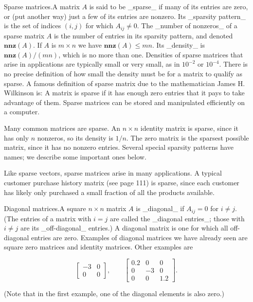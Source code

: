 
Sparse matrices.A matrix \(A\) is said to be _sparse_ if many of its entries are zero, or (put another way) just a few of its entries are nonzero. Its _sparsity pattern_ is the set of indices \((i,j)\) for which \(A_{ij}\neq 0\). The _number of nonzeros_ of a sparse matrix \(A\) is the number of entries in its sparsity pattern, and denoted \(\mathbf{nnz}(A)\). If \(A\) is \(m\times n\) we have \(\mathbf{nnz}(A)\leq mn\). Its _density_ is \(\mathbf{nnz}(A)/(mn)\), which is no more than one. Densities of sparse matrices that arise in applications are typically small or very small, as in \(10^{-2}\) or \(10^{-4}\). There is no precise definition of how small the density must be for a matrix to qualify as sparse. A famous definition of sparse matrix due to the mathematician James H. Wilkinson is: A matrix is sparse if it has enough zero entries that it pays to take advantage of them. Sparse matrices can be stored and manipulated efficiently on a computer.

Many common matrices are sparse. An \(n\times n\) identity matrix is sparse, since it has only \(n\) nonzeros, so its density is \(1/n\). The zero matrix is the sparsest possible matrix, since it has no nonzero entries. Several special sparsity patterns have names; we describe some important ones below.

Like sparse vectors, sparse matrices arise in many applications. A typical customer purchase history matrix (see page 111) is sparse, since each customer has likely only purchased a small fraction of all the products available.

Diagonal matrices.A square \(n\times n\) matrix \(A\) is _diagonal_ if \(A_{ij}=0\) for \(i\neq j\). (The entries of a matrix with \(i=j\) are called the _diagonal entries_; those with \(i\neq j\) are its _off-diagonal_ entries.) A diagonal matrix is one for which all off-diagonal entries are zero. Examples of diagonal matrices we have already seen are square zero matrices and identity matrices. Other examples are

\[\left[\begin{array}{rrr}-3&0\\ 0&0\end{array}\right],\qquad\left[\begin{array}{rrr}0.2&0&0\\ 0&-3&0\\ 0&0&1.2\end{array}\right].\]

(Note that in the first example, one of the diagonal elements is also zero.)

